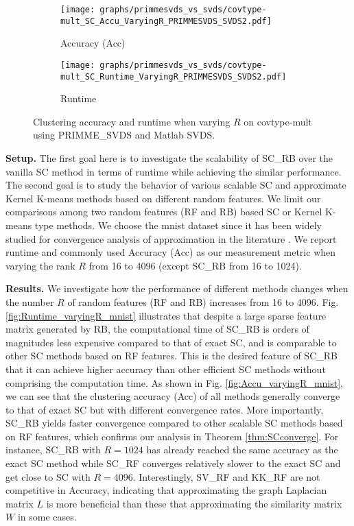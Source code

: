 \documentclass[sigconf]{acmart}
\newcommand{\1}{\boldsymbol{1}}
\newcommand{\0}{\boldsymbol{0}}
\begin{document}
\begin{figure}[!htb]
\centering
	  \begin{subfigure}[b]{0.23\textwidth}
      \texttt{[image: graphs/primmesvds\_vs\_svds/covtype-mult\_SC\_Accu\_VaryingR\_PRIMMESVDS\_SVDS2.pdf]}
      \caption{Accuracy (Acc)}
      \label{fig:Accu_varyingR_covtype-mult}
      \end{subfigure}
	  \begin{subfigure}[b]{0.23\textwidth}
      \texttt{[image: graphs/primmesvds\_vs\_svds/covtype-mult\_SC\_Runtime\_VaryingR\_PRIMMESVDS\_SVDS2.pdf]}
      \caption{Runtime}
      \label{fig:Runtime_varyingR_covtype-mult}
      \end{subfigure}
\caption{Clustering accuracy and runtime when varying $R$ on covtype-mult using PRIMME\_SVDS and Matlab SVDS.}
 \vspace{0mm}
\label{fig:Accu_runtime_varyingR_covtype-mult}
\end{figure}

\textbf{Setup.} 
The first goal here is to investigate the scalability of SC\_RB over the vanilla SC method in terms of runtime while achieving the similar performance. The second goal is to study the behavior of various scalable SC and approximate Kernel K-means methods based on different random features. We limit our comparisons among two random features (RF and RB) based SC or Kernel K-means type methods.  
We choose the mnist dataset since it has been widely studied for  convergence analysis of approximation in the literature \cite{chitta2012efficient,chen2011large,li2016scalable}. We report runtime and commonly used Accuracy (Acc) as our measurement metric when varying the rank $R$ from 16 to 4096 (except SC\_RB from 16 to 1024).

\textbf{Results.}
We investigate how the performance of different methods changes when the number $R$ of random features (RF and RB) increases from 16 to 4096. 
Fig. \ref{fig:Runtime_varyingR_mnist} illustrates that despite a large sparse feature matrix generated by RB, the computational time of SC\_RB is orders of magnitudes less expensive compared to that of exact SC, and is comparable to other SC methods based on RF features. This is the desired feature of SC\_RB that it can achieve higher accuracy than other efficient SC methods without comprising the computation time. 
As shown in Fig. \ref{fig:Accu_varyingR_mnist}, we can see that the clustering accuracy (Acc) of all methods generally converge to that of exact SC but with different convergence rates. More importantly, SC\_RB yields faster convergence compared to other scalable SC methods based on RF features, which confirms our analysis in Theorem \ref{thm:SCconverge}. For instance, SC\_RB with $R=1024$ has already reached the same accuracy as the exact SC method while SC\_RF converges relatively slower to the exact SC and get close to SC with $R=4096$. Interestingly, SV\_RF and KK\_RF are not competitive in Accuracy, indicating that approximating the graph Laplacian matrix $L$ is more beneficial than these that approximating the similarity matrix $W$ in some cases.
\end{document}
